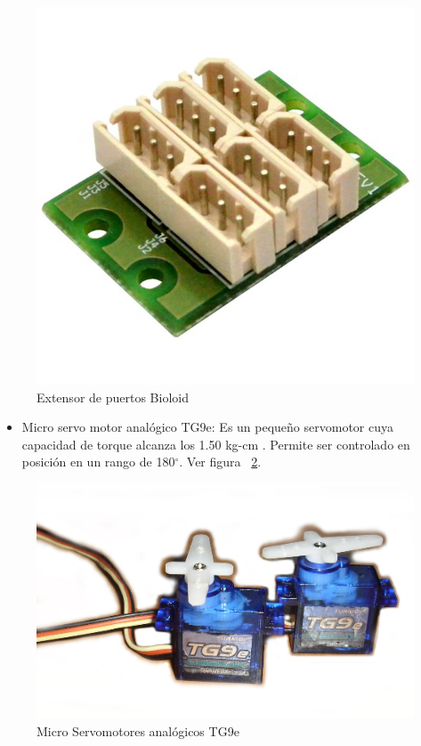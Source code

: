 \begin{figure}[hbtp]
\centering
\includegraphics[scale=0.15]{imagenes/Dynamixel-AX-MX-6-Port-Extension-Hub-600x600.jpg}
\caption{Extensor de puertos Bioloid}
\label{fig:ext}
\end{figure}

\begin{itemize}
\item Micro servo motor anal\'ogico TG9e: Es un pequeño servomotor cuya capacidad de torque alcanza los 1.50 kg-cm \cite{microservo}. Permite ser controlado en posición en un rango de 180$^{\circ}$. Ver figura ~\ref{fig:Servo}.  

\end{itemize}

\begin{figure}[hbtp]
\centering
\includegraphics[scale=0.09]{imagenes/servosTg9B.jpg}

\caption{Micro Servomotores analógicos TG9e}

\label{fig:Servo}
\end{figure}

